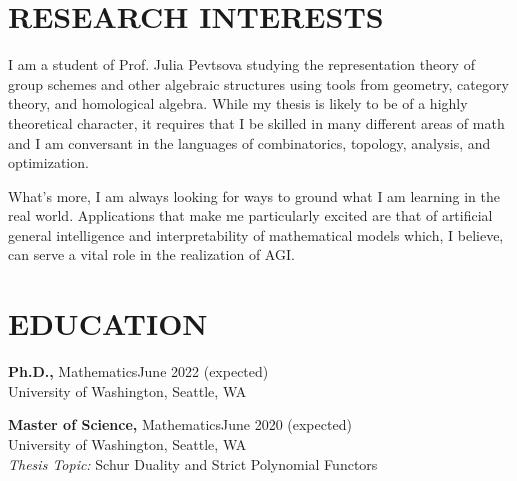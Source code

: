 \documentclass[margin]{res} %
\begin{document}
\begin{resume}

 
\section{RESEARCH INTERESTS}  


I am a student of Prof. Julia Pevtsova studying the representation theory of group schemes and other 
algebraic structures using tools from geometry, category theory, and homological algebra. While my thesis 
is likely to be of a highly theoretical character, it requires that I be skilled in many different areas of math and 
I am conversant in the languages of combinatorics, topology, analysis, and optimization.

What's more, I am always looking for ways to ground what I am learning in the 
real world. Applications that make me particularly excited are that of artificial general intelligence and 
interpretability of mathematical models which, I believe, can serve a vital role in the realization of AGI.


\section{EDUCATION}

{\bf Ph.D.,} Mathematics\hfill June 2022 (expected) \\
University of Washington, Seattle, WA

{\bf Master of Science,} Mathematics\hfill June 2020 (expected) \\
University of Washington, Seattle, WA \\
{\it Thesis Topic:} Schur Duality and Strict Polynomial Functors


\end{resume}
\end{document}

